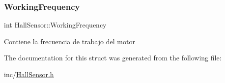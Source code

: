 \subsubsection{\texorpdfstring{Working\+Frequency}{WorkingFrequency}}
{\footnotesize\ttfamily int Hall\+Sensor\+::\+Working\+Frequency}

Contiene la frecuencia de trabajo del motor 

The documentation for this struct was generated from the following file\+:\begin{DoxyCompactItemize}
\item 
inc/\mbox{\hyperlink{_hall_sensor_8h}{Hall\+Sensor.\+h}}\end{DoxyCompactItemize}
